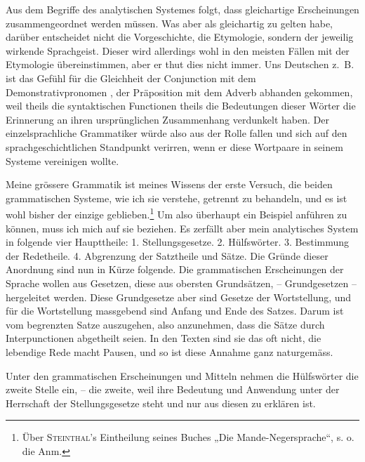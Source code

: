 \largerpage[-1]Aus dem Begriffe des analytischen Systemes folgt, dass gleichartige Erscheinungen zusammengeordnet werden müssen. Was aber als gleichartig zu gelten habe, darüber entscheidet nicht die Vorgeschichte, die Etymologie, sondern der jeweilig wirkende Sprachgeist. Dieser wird allerdings wohl in den meisten Fällen mit der Etymologie übereinstimmen, aber er thut dies nicht immer. Uns Deutschen z.~B. ist das Gefühl für die Gleichheit  der Conjunction  mit dem Demonstrativpronomen ,  der Präposition  mit dem Adverb  abhanden gekommen, weil theils die syntaktischen Functionen theils die Bedeutungen dieser Wörter die Erinnerung an ihren ursprünglichen Zusammenhang verdunkelt haben. Der einzelsprachliche Grammatiker würde also aus der Rolle fallen und sich auf den sprachgeschichtlichen Standpunkt verirren, wenn er diese Wortpaare in seinem Systeme vereinigen wollte.

Meine grössere  Grammatik ist meines Wissens der erste Versuch, die beiden grammatischen Systeme, wie ich sie verstehe, getrennt zu behandeln, und es ist wohl bisher der einzige geblieben.\footnote{Über \textsc{Steinthal}’s Eintheilung seines Buches „Die Mande-Negersprache“, s. o. die Anm. } Um also überhaupt ein Beispiel anführen zu können, muss ich mich auf \label{fp.93} sie beziehen. Es zerfällt aber mein analytisches System in folgende vier Haupttheile: 1. Stellungsgesetze. 2. Hülfswörter. 3. Bestimmung der Redetheile. 4. Abgrenzung der Satztheile und Sätze. Die Gründe dieser Anordnung sind nun in Kürze folgende. Die grammatischen Erscheinungen der Sprache wollen aus Gesetzen, diese aus obersten Grundsätzen, – Grundgesetzen – hergeleitet werden. Diese Grundgesetze aber sind Gesetze der Wortstellung, und für die Wortstellung massgebend sind Anfang und Ende \label{sp.91} des Satzes. Darum ist vom begrenzten Satze auszugehen, also anzunehmen, dass die Sätze durch Interpunctionen abgetheilt seien. In den Texten sind sie das oft nicht, die lebendige Rede macht  Pausen, und so ist diese Annahme ganz naturgemäss.

Unter den grammatischen Erscheinungen und Mitteln nehmen die Hülfswörter die zweite Stelle ein, – die zweite, weil ihre Bedeutung und Anwendung unter der Herrschaft der Stellungsgesetze steht und nur aus diesen zu erklären ist.

